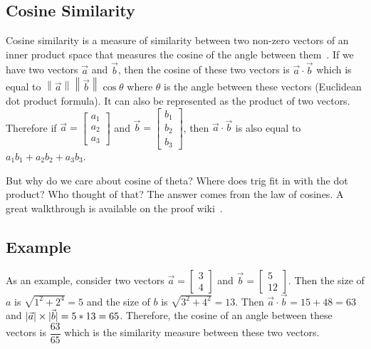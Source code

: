 \documentclass[11pt]{article}
\DeclarePairedDelimiter\abs{\lvert}{\rvert}               %
\begin{document}
\subsection{Cosine Similarity}

Cosine similarity is a measure of similarity between two non-zero vectors of an
inner product space that measures the cosine of the angle between
them~\cite{wikicosine}. If we have two vectors \(\vec{a}\) and \(\vec{b}\), then the cosine of
these two vectors is \(\vec{a} \cdot \vec{b}\) which is equal to
\(\left\|\vec{a}\right\|\left\|\vec{b}\right\|\cos\theta\) where \(\theta\) is the angle
between these vectors (Euclidean dot product formula). It can also be
represented as the product of two vectors. Therefore if
\(\vec{a} = \begin{bmatrix}a_1 \\ a_2 \\ a_3\end{bmatrix}\) and
\(\vec{b} = \begin{bmatrix}b_1 \\ b_2 \\ b_3\end{bmatrix}\), then
\(\vec{a} \cdot \vec{b}\) is also equal to \(a_1b_1 + a_2b_2 + a_3b_3\).

\bigskip

But why do we care about cosine of theta? Where does trig fit in with the dot
product? Who thought of that? The answer comes from the law of cosines. A great
walkthrough is available on the proof wiki~\cite{wikicosineproof}.

\subsection{Example}

As an example, consider two vectors
\(\vec{a} = \begin{bmatrix}3 \\ 4\end{bmatrix}\)
and \(\vec{b} = \begin{bmatrix}5 \\ 12\end{bmatrix}\). Then the size of \(a\) is
\(\sqrt{1^2 + 2^4} = 5\) and the size of \(b\) is \(\sqrt{3^2 + 4^2} = 13\).
Then \(\vec{a} \cdot \vec{b} = 15 + 48 = 63\) and
\(\abs{\vec{a}} \times \abs{\vec{b}} = 5 * 13 = 65\). Therefore, the cosine of
an angle between these vectors is \(\dfrac{63}{65}\) which is the similarity
measure between these two vectors.
\end{document}
